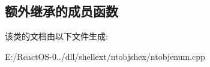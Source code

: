 \subsection*{额外继承的成员函数}


该类的文档由以下文件生成\+:\begin{DoxyCompactItemize}
\item 
E\+:/\+React\+O\+S-\/0../dll/shellext/ntobjshex/ntobjenum.\+cpp\end{DoxyCompactItemize}
